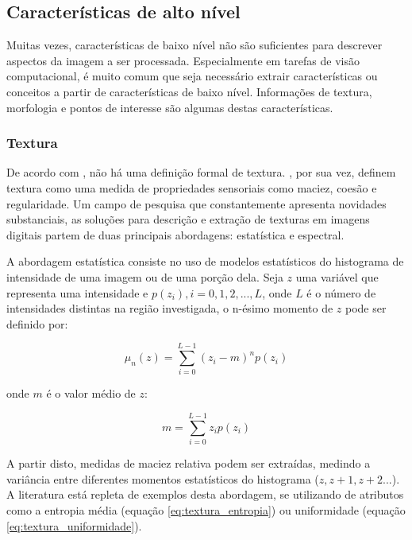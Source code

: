 \subsection{Características de alto nível}

Muitas vezes, características de baixo nível não são suficientes para descrever aspectos da imagem a ser processada. Especialmente em tarefas de visão computacional, é muito comum que seja necessário extrair características ou conceitos a partir de características de baixo nível. Informações de textura, morfologia e pontos de interesse são algumas destas características.

\subsubsection*{Textura}

De acordo com , não há uma definição formal de textura. , por sua vez, definem textura como uma medida de propriedades sensoriais como maciez, coesão e regularidade. Um campo de pesquisa que constantemente apresenta novidades substanciais, as soluções para descrição e extração de texturas em imagens digitais partem de duas principais abordagens: estatística e  espectral.

A abordagem estatística consiste no uso de modelos estatísticos do histograma de intensidade de uma imagem ou de uma porção dela. Seja $z$ uma variável que representa uma intensidade e $p(z_i), i = 0, 1, 2,..., L$, onde $L$ é o número de intensidades distintas na região investigada, o n-ésimo momento de $z$ pode ser definido por:

\begin{equation}
	\displaystyle \mu_n(z) = \sum_{i=0}^{L-1} (z_i - m)^n p(z_i)
\end{equation}

onde $m$ é o valor médio de $z$:

\begin{equation}
	\displaystyle m = \sum_{i=0}^{L-1} z_i p(z_i)
\end{equation}

A partir disto, medidas de maciez relativa podem ser extraídas, medindo a variância entre diferentes momentos estatísticos do histograma ($z, z+1, z+2...$). A literatura está repleta de exemplos desta abordagem, se utilizando de atributos como a entropia média (equação \ref{eq:textura_entropia}) ou uniformidade (equação \ref{eq:textura_uniformidade}).

